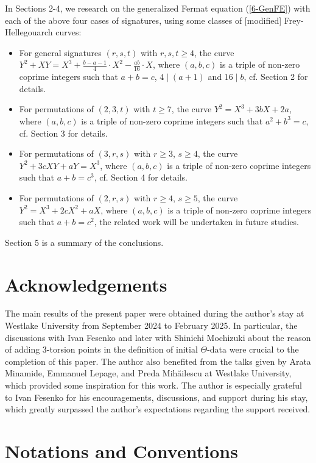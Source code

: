 \documentclass[a4paper, 12pt]{article}
\numberwithin{equation}{section}
\theoremstyle{definition}
\begin{document}
 In Sections 2-4, we research on the generalized Fermat equation (\ref{6-GenFE}) with each of the above four cases of signatures, using some classes of [modified] Frey-Hellegouarch curves:
\begin{itemize}
\item For general signatures $(r, s, t)$ with $r, s, t \ge 4$, the curve $Y^2 + XY = X^3 + \frac{b-a-1}{4}\cdot X^2 - \frac{ab}{16}\cdot X$, 
where $(a,b,c)$ is a triple of non-zero coprime integers such that $a+b = c$, $4\mid (a+1)$ and $16\mid b$, cf. Section 2 for details.
\item For permutations of $(2, 3, t)$ with $t \ge 7$, the curve $Y^2 = X^3 + 3bX + 2a$, 
where $(a,b,c)$ is a triple of non-zero coprime integers such that $a^2 + b^3 = c$, cf. Section 3 for details.
\item For permutations of $(3, r, s)$ with $r \ge 3$, $s \ge 4$, the curve $Y^2 + 3cXY + aY= X^3$,
where $(a,b,c)$ is a triple of non-zero coprime integers such that $a + b = c^3$, cf. Section 4 for details.
\item For permutations of $(2, r, s)$ with $r \ge 4$, $s \ge 5$, the curve $Y^2 = X^3 + 2cX^2 + aX$, 
where $(a,b,c)$ is a triple of non-zero coprime integers such that $a + b = c^2$, the related work will be undertaken in future studies.
\end{itemize}

Section 5 is a summary of the conclusions.


\section*{Acknowledgements}
The main results of the present paper were obtained during the author's stay at Westlake University from September 2024 to February 2025.
In particular, the discussions with Ivan Fesenko and later with Shinichi Mochizuki about the reason of adding 3-torsion points in the definition of initial $\Theta$-data were crucial to the completion of this paper. 
The author also benefited from the talks given by Arata Minamide, Emmanuel Lepage, and Preda Mihăilescu at Westlake University, which provided some inspiration for this work. 
The author is especially grateful to Ivan Fesenko for his encouragements, discussions, and support during his stay, which greatly surpassed the author's expectations regarding the support received.


 \setcounter{section}{-1}
\section{Notations and Conventions}
\end{document}
